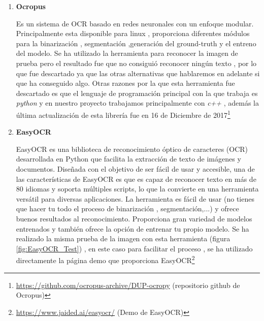 \begin{enumerate}
	\item \textbf{Ocropus}
	
	Es un sistema de OCR basado en redes neuronales con un enfoque modular.
	Principalmente esta disponible para linux , proporciona diferentes módulos para la binarización , segmentación ,generación del ground-truth y el entreno del modelo.
	Se ha utilizado la herramienta para reconocer la imagen de prueba pero el resultado fue que no consiguió reconocer ningún texto , por lo que fue descartado ya que las otras alternativas que hablaremos en adelante si que ha conseguido algo.
	Otras razones por la que esta herramienta fue descartado es que el lenguaje de programación principal con la que trabaja es \emph{python} y en nuestro proyecto trabajamos principalmente con \emph{c++} , además la última actualización de esta librería fue en 16 de Diciembre de 2017\footnote{\url{https://github.com/ocropus-archive/DUP-ocropy} (repositorio github de Ocropus)}
	
	\item \textbf{EasyOCR}
	
	EasyOCR es una biblioteca de reconocimiento óptico de caracteres (OCR) desarrollada en Python que facilita la extracción de texto de imágenes y documentos. Diseñada con el objetivo de ser fácil de usar y accesible, una de las características de EasyOCR es que es capaz de reconocer texto en más de 80 idiomas y soporta múltiples scripts, lo que la convierte en una herramienta versátil para diversas aplicaciones.
	La herramienta es fácil de usar (no tienes que hacer tu todo el proceso de binarización , segmentación,...) y ofrece buenos resultados al reconocimiento.
	Proporciona gran variedad de modelos entrenados y también ofrece la opción de entrenar tu propio modelo.
	Se ha realizado la misma prueba de la imagen con esta herramienta (figura \ref{fig:EasyOCR_Test}) , en este caso para facilitar el proceso , se ha utilizado directamente la página demo que proporciona EasyOCR\footnote{\url{https://www.jaided.ai/easyocr/} (Demo de EasyOCR)}
	

\end{enumerate}
